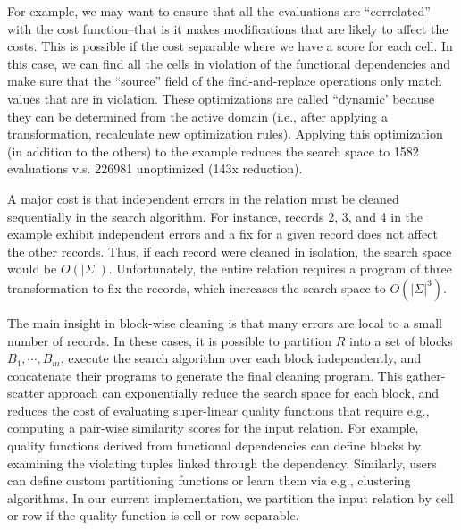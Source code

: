 
For example, we may want to ensure that all the evaluations are ``correlated'' with the cost function--that is it makes modifications that are likely to affect the costs.  This is possible if the cost separable where we have a score for each cell. In this case, we can find all the cells in violation of the functional dependencies and make sure that the ``source'' field of the find-and-replace operations only match values that are in violation.  These optimizations are called ``dynamic' because they can be determined from the active domain (i.e., after applying a transformation, recalculate new optimization rules).  Applying this optimization (in addition to the others) to the example reduces the search space to 1582 evaluations v.s. 226981 unoptimized (143x reduction).

A major cost is that independent errors in the relation must be cleaned sequentially in the search algorithm.  For instance, records 2, 3, and 4 in the example exhibit independent errors and a fix for a given record does not affect the other records.  Thus, if each record were cleaned in isolation, the search space would be $O(|\Sigma|)$.  Unfortunately, the entire relation requires a program of three transformation to fix the records, which increases the search space to $O(|\Sigma|^3)$.

The main insight in block-wise cleaning is that many errors are local to a small number of records.  In these cases, it is possible to partition $R$ into a set of blocks $B_1,\cdots,B_m$, execute the search algorithm over each block independently, and concatenate their programs to generate the final cleaning program.  This gather-scatter approach can exponentially reduce the search space for each block, and reduces the cost of evaluating super-linear quality functions that require e.g., computing a pair-wise similarity scores for the input relation.    For example, quality functions derived from functional dependencies can define blocks by examining the violating tuples linked through the dependency.  Similarly, users can define custom partitioning functions or learn them via e.g., clustering algorithms.  In our current implementation, we partition the input relation by cell or row if the quality function is cell or row separable.


